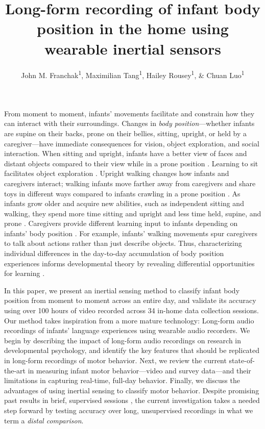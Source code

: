 \documentclass[
  man]{apa6}
\title{Long-form recording of infant body position in the home using wearable inertial sensors}
\author{John M. Franchak\textsuperscript{1}, Maximilian Tang\textsuperscript{1}, Hailey Rousey\textsuperscript{1}, \& Chuan Luo\textsuperscript{1}}
\date{}
\affiliation{\phantom{0}}
\begin{document}
\maketitle

From moment to moment, infants' movements facilitate and constrain how they can interact with their surroundings. Changes in \emph{body position}---whether infants are supine on their backs, prone on their bellies, sitting, upright, or held by a caregiver---have immediate consequences for vision, object exploration, and social interaction. When sitting and upright, infants have a better view of faces and distant objects compared to their view while in a prone position \autocite{Freeplay,LuoFranchak2020,CWW}. Learning to sit facilitates object exploration \autocite{SoskaAdolph2014}. Upright walking changes how infants and caregivers interact; walking infants move farther away from caregivers and share toys in different ways compared to infants crawling in a prone position \autocite{ChenSchneider2022,Karasik2011}. As infants grow older and acquire new abilities, such as independent sitting and walking, they spend more time sitting and upright and less time held, supine, and prone \autocite{Survey,Thurman2017,Freeplay,AdolphCTL2014}. Caregivers provide different learning input to infants depending on infants' body position \autocite{KretchKoziol2022,WestIverson2021,Karasik2014}. For example, infants' walking movements spur caregivers to talk about actions rather than just describe objects. Thus, characterizing individual differences in the day-to-day accumulation of body position experiences informs developmental theory by revealing differential opportunities for learning \autocite{CurrentOpinion}.

In this paper, we present an inertial sensing method to classify infant body position from moment to moment across an entire day, and validate its accuracy using over 100 hours of video recorded across 34 in-home data collection sessions. Our method takes inspiration from a more mature technology: Long-form audio recordings of infants' language experiences using wearable audio recorders. We begin by describing the impact of long-form audio recordings on research in developmental psychology, and identify the key features that should be replicated in long-form recordings of motor behavior. Next, we review the current state-of-the-art in measuring infant motor behavior---video and survey data---and their limitations in capturing real-time, full-day behavior. Finally, we discuss the advantages of using inertial sensing to classify motor behavior. Despite promising past results in brief, supervised sessions \autocite{FranchakScott2021,AiraksinenRasanen2020,AiraksinenGallen2022}, the current investigation takes a needed step forward by testing accuracy over long, unsupervised recordings in what we term a \emph{distal comparison}.
\end{document}
